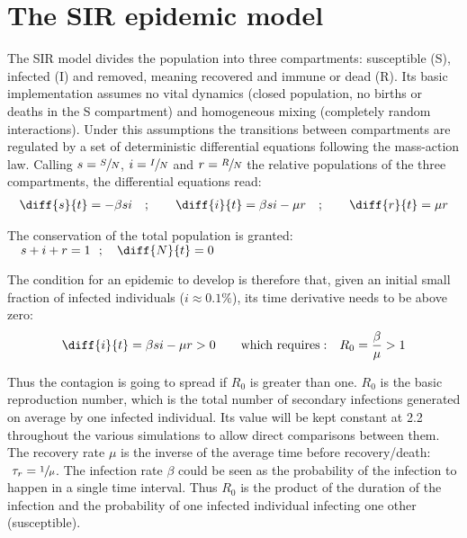 \documentclass[DIV=12, BCOR=0pt]{scrartcl}  %
\begin{document}
  
  
  
  \section{The SIR epidemic model}
  The SIR model divides the population into three compartments: susceptible (S), infected (I) and removed, meaning recovered and immune or dead (R). Its basic implementation assumes no vital dynamics (closed population, no births or deaths in the S compartment) and homogeneous mixing (completely random interactions). Under this assumptions the transitions between compartments are regulated by a set of deterministic differential equations following the mass-action law. Calling $s = \sfrac{S}{N}$, $i = \sfrac{I}{N}$ and $r = \sfrac{R}{N}$ the relative populations of the three compartments, the differential equations read:
  \begin{align}
  	\diff{s}{t} = - \beta s i \quad;  \qquad 	\diff{i}{t} = \beta s i - \mu r \quad; \qquad  \diff{r}{t} = \mu r
  \end{align}
  
  The conservation of the total population is granted: $\quad s + i + r = 1 \ \ ; \quad \diff{N}{t} = 0$
  
  The condition for an epidemic to develop is therefore that, given an initial small fraction of infected individuals ($i \approx 0.1 \%$), its time derivative needs to be above zero:
  \begin{align}
  	\diff{i}{t} = \beta s i - \mu r > 0 \qquad \mathrm{which \ requires:} \quad 		R_{0} = \frac{\beta}{\mu} > 1
  \end{align}
  
  Thus the contagion is going to spread if $R_{0}$ is greater than one. $R_{0}$ is the basic reproduction number, which is the total number of secondary infections generated on average by one infected individual. Its value will be kept constant at 2.2 throughout the various simulations to allow direct comparisons between them.
  The recovery rate $\mu$ is the inverse of the average time before recovery/death: $\ \tau_{r} = \sfrac{1}{\mu}$. The infection rate $\beta$ could be seen as the probability of the infection to happen in a single time interval. Thus $R_{0}$ is the product of the duration of the infection and the probability of one infected individual infecting one other (susceptible).
  
\end{document}
